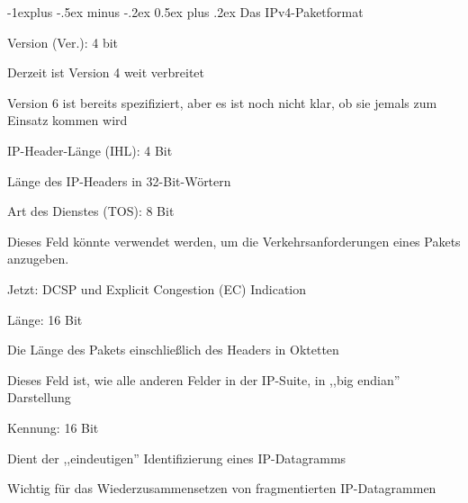 \documentclass[a4paper]{article}
\makeatletter
\renewcommand{\subsection}{\@startsection{subsection}{2}{0mm}%
 {-1explus -.5ex minus -.2ex}%
 {0.5ex plus .2ex}%
 {\normalfont\normalsize\bfseries}}
\makeatother
\begin{document}
\begin{multicols}{3}
      \subsection{Das IPv4-Paketformat}

      \begin{itemize*}
            \item Version (Ver.): 4 bit
            \begin{itemize*}
                  \item Derzeit ist Version 4 weit verbreitet
                  \item Version 6 ist bereits spezifiziert, aber es ist noch nicht klar, ob sie jemals zum Einsatz kommen wird
            \end{itemize*}
            \item IP-Header-Länge (IHL): 4 Bit
            \begin{itemize*}
                  \item Länge des IP-Headers in 32-Bit-Wörtern
            \end{itemize*}
            \item Art des Dienstes (TOS): 8 Bit
            \begin{itemize*}
                  \item Dieses Feld könnte verwendet werden, um die Verkehrsanforderungen eines Pakets anzugeben.
                  \item Jetzt: DCSP und Explicit Congestion (EC) Indication
            \end{itemize*}
            \item Länge: 16 Bit
            \begin{itemize*}
                  \item Die Länge des Pakets einschließlich des Headers in Oktetten
                  \item Dieses Feld ist, wie alle anderen Felder in der IP-Suite, in ,,big endian'' Darstellung
            \end{itemize*}
            \item Kennung: 16 Bit
            \begin{itemize*}
                  \item Dient der ,,eindeutigen'' Identifizierung eines IP-Datagramms
                  \item Wichtig für das Wiederzusammensetzen von fragmentierten IP-Datagrammen

\end{itemize*}
\end{itemize*}
\end{multicols}
\end{document}
